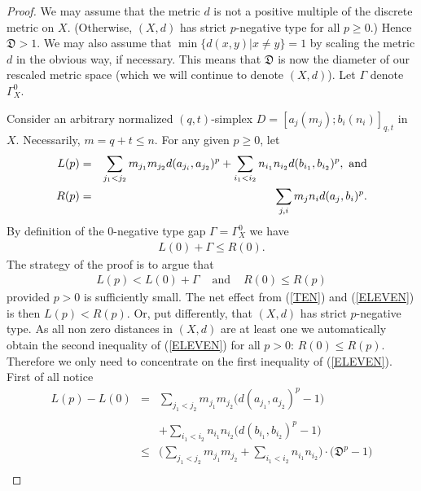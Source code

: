 \documentclass[10pt]{amsart}
\theoremstyle{definition}
\theoremstyle{remark}
\begin{document}
\begin{proof}
We may assume that the metric $d$ is not a positive multiple of the discrete metric on $X$. (Otherwise, $(X,d)$ has
strict $p$-negative type for all $p \geq 0$.) Hence $\mathfrak{D} > 1$. We may also assume that
$\min \{d(x,y) | x \not= y\} = 1$ by scaling the metric $d$ in the obvious way, if necessary.
This means that $\mathfrak{D}$ is now the diameter of our rescaled metric space (which we will continue
to denote $(X,d)$). Let $\Gamma$ denote $\Gamma_{X}^{0}$.

Consider an arbitrary normalized $(q,t)$-simplex $D = [a_{j}(m_{j});b_{i}(n_{i})]_{q,t}$ in $X$. Necessarily,
$m = q+t \leq n$. For any given $p \geq 0$, let
\begin{eqnarray*}
L (p) & = & \sum\limits_{j_{1}<j_{2}} m_{j_{1}}m_{j_{2}}d(a_{j_{i}},a_{j_{2}})^{p}
+ \sum\limits_{i_{1}<i_{2}} n_{i_{1}}n_{i_{2}}d(b_{i_{1}},b_{i_{2}})^{p},\,\,{\rm{and}} \\
R (p) & = & \sum\limits_{j,i} m_{j}n_{i}d(a_{j},b_{i})^{p}.
\end{eqnarray*}
By definition of the $0$-negative type gap $\Gamma = \Gamma_{X}^{0}$ we have
\begin{eqnarray}\label{TEN}
L(0) + \Gamma \leq R(0).
\end{eqnarray}
The strategy of the proof is to argue that
\begin{eqnarray}\label{ELEVEN}
L(p) < L(0) + \Gamma
& \text{ and } &
R(0) \leq R(p)
\end{eqnarray}
provided $p > 0$ is sufficiently small. The net effect from (\ref{TEN}) and (\ref{ELEVEN}) is then
$L(p) < R(p)$. Or, put differently, that $(X,d)$ has strict $p$-negative type.
As all non zero distances in $(X,d)$ are at least one we automatically obtain the second inequality
of (\ref{ELEVEN}) for all $p > 0$: $R(0) \leq R(p)$.
Therefore we only need to concentrate on the first inequality of (\ref{ELEVEN}). First of all notice
\begin{eqnarray}\label{TWELVE}
L (p) - L (0) & = & \sum\limits_{j_{1}<j_{2}} m_{j_{1}}m_{j_{2}}
\bigl( d(a_{j_{1}},a_{j_{2}})^{p} - 1 \bigl) \\
& ~ & ~ \nonumber \\
& ~ & + \sum\limits_{i_{1}<i_{2}} n_{i_{1}}n_{i_{2}}
\bigl( d(b_{i_{1}},b_{i_{2}})^{p} - 1 \bigl) \nonumber \\
& \leq & \Biggl(\sum\limits_{j_{1}<j_{2}} m_{j_{1}}m_{j_{2}}
+ \sum\limits_{i_{1}<i_{2}} n_{i_{1}}n_{i_{2}} \Biggl) \cdot \bigl( \mathfrak{D}^{p} - 1 \bigl) \nonumber \\

\end{eqnarray}
\end{proof}
\end{document}
